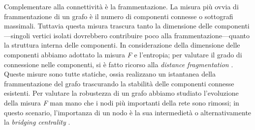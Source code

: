 Complementare alla connettivit\`a \`e la frammentazione. La misura pi\`u ovvia di frammentazione di un grafo \`e il numero di componenti connesse o sottografi massimali. Tuttavia questa misura trascura tanto la dimensione delle componenti---singoli vertici isolati dovrebbero contribuire poco alla frammentazione---quanto la struttura interna delle componenti. In considerazione della dimensione delle componenti abbiamo adottato la misura \textit{F} \cite{borgatti_2002} e l'entropia; per valutare il grado di connessione nelle componenti, si \`e fatto ricorso alla \textit{distance fragmentation} \cite{borgatti_2002}. Queste misure sono tutte statiche, ossia realizzano un istantanea della frammentazione del grafo trascurando la stabilit\`a delle componenti connesse esistenti. Per valutare la robustezza di un grafo abbiamo studiato l'evoluzione della misura \textit{F} man mano che i nodi pi\`u importanti della rete sono rimossi; in questo scenario, l'importanza di un nodo \`e la sua intermediet\`a o alternativamente la \textit{bridging centrality} \cite{Hwang_2008}.


